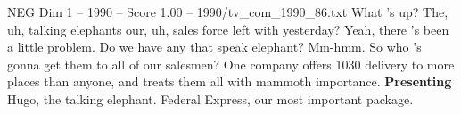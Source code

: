 \begin{textsample}{NEG Dim 1 – 1990 – Score 1.00 – 1990/tv\_com\_1990\_86.txt}  \label{ex:f1_neg_050}
What 's up?
The, uh, talking elephants our, uh, sales force left with yesterday?
Yeah, there 's been a little problem.
Do we have any that speak elephant?
Mm-hmm.
So who 's gonna get them to all of our salesmen?
One company offers 1030 delivery to more places than anyone, and treats them all with mammoth importance. \textbf{Presenting} Hugo, the talking elephant.
Federal Express, our most important package.

\end{textsample}
